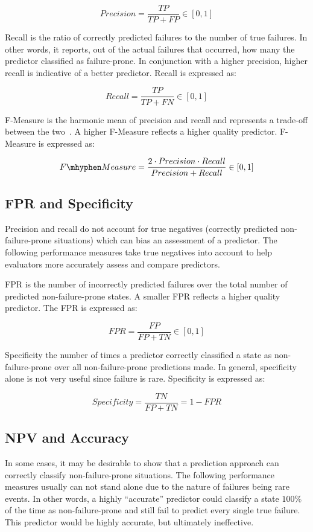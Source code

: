 \[ Precision 
	= \dfrac{TP}{TP + FP} \in [0,1]
\]

Recall is the ratio of correctly predicted failures to the number of true
failures.  In other words, it reports, out of the actual failures that
occurred, how many the predictor classified as failure-prone.  In conjunction
with a higher precision, higher recall is indicative of a better predictor.
Recall is expressed as:

\[ Recall 
	= \dfrac{TP}{TP + FN} \in [0,1]
\]

F-Measure is the harmonic mean of precision and recall and represents a
trade-off between the two~\cite{rijsbergen1979v}.  A higher F-Measure reflects
a higher quality predictor.  F-Measure is expressed as:

\[ F\mhyphen Measure 
	= \dfrac{2 \cdot Precision \cdot Recall}{Precision + Recall} \in [0,1]
\]

\subsection{\ac{FPR} and Specificity}
Precision and recall do not account for true negatives (correctly predicted
non-failure-prone situations) which can bias an assessment of a predictor.  The
following performance measures take true negatives into account to help
evaluators more accurately assess and compare predictors.

\ac{FPR} is the number of incorrectly predicted failures over the total number
of predicted non-failure-prone states.  A smaller \ac{FPR} reflects a higher
quality predictor.  The \ac{FPR} is expressed as:

\[ \mathit{FPR}
	= \dfrac{FP}{FP + TN} \in [0,1]
\]

Specificity the number of times a predictor correctly classified a state as
non-failure-prone over all non-failure-prone predictions made.  In general,
specificity alone is not very useful since failure is rare.  Specificity is
expressed as:

\[ Specificity 
	= \dfrac{TN}{FP + TN} = 1 - FPR
\]

\subsection{\ac{NPV} and Accuracy}
In some cases, it may be desirable to show that a prediction approach can
correctly classify non-failure-prone situations.  The following performance
measures usually can not stand alone due to the nature of failures being rare
events.  In other words, a highly ``accurate'' predictor could classify a state
$100\%$ of the time as non-failure-prone and still fail to predict every single
true failure.  This predictor would be highly accurate, but ultimately
ineffective.

